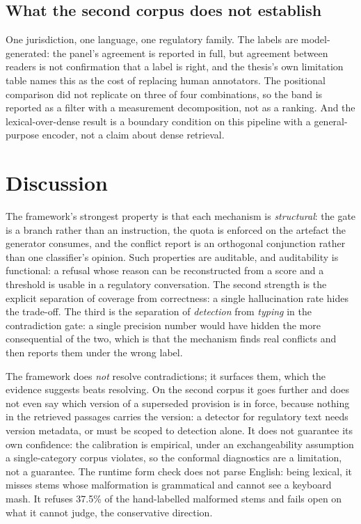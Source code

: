 \documentclass[conference]{IEEEtran}
\begin{document}
\subsection{What the second corpus does not establish}

One jurisdiction, one language, one regulatory family. The labels are
model-generated: the panel's agreement is reported in full, but agreement
between readers is not confirmation that a label is right, and the thesis's
own limitation table names this as the cost of replacing human annotators.
The positional comparison did not replicate on three of four combinations, so
the band is reported as a filter with a measurement decomposition, not as a
ranking. And the lexical-over-dense result is a boundary condition on this
pipeline with a general-purpose encoder, not a claim about dense retrieval.

\section{Discussion}

The framework's strongest property is that each mechanism is \emph{structural}:
the gate is a branch rather than an instruction, the quota is enforced on the
artefact the generator consumes, and the conflict report is an orthogonal
conjunction rather than one classifier's opinion. Such properties are auditable,
and auditability is functional: a refusal whose reason can be reconstructed
from a score and a threshold is usable in a regulatory conversation. The second
strength is the explicit separation of coverage from correctness: a single
hallucination rate hides the trade-off. The third is the separation of
\emph{detection} from \emph{typing} in the contradiction gate: a single
precision number would have hidden the more consequential of the two, which
is that the mechanism finds real conflicts and then reports them under the
wrong label.

The framework does \emph{not} resolve contradictions; it surfaces them, which
the evidence suggests beats resolving. On the second corpus it goes further
and does not even say which version of a superseded provision is in force,
because nothing in the retrieved passages carries the version: a detector for
regulatory text needs version metadata, or must be scoped to detection alone.
It does not guarantee its own
confidence: the calibration is empirical, under an exchangeability assumption a
single-category corpus violates, so the conformal diagnostics are a limitation,
not a guarantee. The runtime form check does not parse English: being lexical,
it misses stems whose malformation is grammatical and cannot see a keyboard
mash. It refuses 37.5\% of the hand-labelled malformed stems
and fails open on what it cannot judge, the conservative direction.
\end{document}
